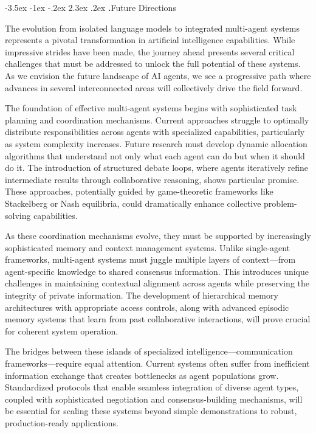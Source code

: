 \documentclass[journal,twoside,10pt]{IEEEtran}
\makeatletter
\renewcommand\section{\@startsection{section}{1}{\z@}%
                       {-3.5ex \@plus -1ex \@minus -.2ex}%
                       {2.3ex \@plus.2ex}%
                       {\normalfont\Large\bfseries\Roman{section}.\quad}}
\makeatother
\begin{document}
\section{Future Directions} 


The evolution from isolated language models to integrated multi-agent systems represents a pivotal transformation in artificial intelligence capabilities. While impressive strides have been made, the journey ahead presents several critical challenges that must be addressed to unlock the full potential of these systems. As we envision the future landscape of AI agents, we see a progressive path where advances in several interconnected areas will collectively drive the field forward.

The foundation of effective multi-agent systems begins with sophisticated task planning and coordination mechanisms. Current approaches struggle to optimally distribute responsibilities across agents with specialized capabilities, particularly as system complexity increases. Future research must develop dynamic allocation algorithms that understand not only what each agent can do but when it should do it. The introduction of structured debate loops, where agents iteratively refine intermediate results through collaborative reasoning, shows particular promise. These approaches, potentially guided by game-theoretic frameworks like Stackelberg or Nash equilibria, could dramatically enhance collective problem-solving capabilities.

As these coordination mechanisms evolve, they must be supported by increasingly sophisticated memory and context management systems. Unlike single-agent frameworks, multi-agent systems must juggle multiple layers of context—from agent-specific knowledge to shared consensus information. This introduces unique challenges in maintaining contextual alignment across agents while preserving the integrity of private information. The development of hierarchical memory architectures with appropriate access controls, along with advanced episodic memory systems that learn from past collaborative interactions, will prove crucial for coherent system operation.

The bridges between these islands of specialized intelligence—communication frameworks—require equal attention. Current systems often suffer from inefficient information exchange that creates bottlenecks as agent populations grow. Standardized protocols that enable seamless integration of diverse agent types, coupled with sophisticated negotiation and consensus-building mechanisms, will be essential for scaling these systems beyond simple demonstrations to robust, production-ready applications.
\end{document}
